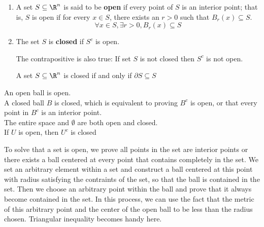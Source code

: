 \documentclass[11pt]{article}
\begin{document}
\begin{defn}
  \label{open and closed set}
  $ $ \\
  \begin{enumerate}
    \item A set $S\subseteq \R^n$ is said to be \textbf{open} if every point of $S$ is an interior point; that is, $S$ is open if for every $x\in S$, there exists an $r > 0$ such that $B_r(x)\subseteq S$.
    \[
      \forall x\in S, \exists r>0, B_r(x)\subseteq S
    \]
    \item The set $S$ is \textbf{closed} if $S^c$ is open.

    \begin{rem}
      The contrapositive is also true: If set $S$ is not closed then $S^c$ is not open.
    \end{rem}
    \begin{proposition}
      A set $S\subseteq \R^n$ is closed if and only if $\partial S\subseteq S$
    \end{proposition}
  \end{enumerate}
  \begin{rem}
    $ $\\
    An open ball is open. \\
    A closed ball $B$ is closed, which is equivalent to proving $B^c$ is open, or that every point in $B^c$ is an interior point. \\
    The entire space and $\emptyset$ are both open and closed. \\
    If $U$ is open, then $U^c$ is closed
  \end{rem}
\end{defn}



\begin{rem}
  To solve that a set is open, we prove all points in the set are interior points or there exists a ball centered at every point that contains completely in the set. We set an arbitrary element within a set and construct a ball centered at this point with radius satisfying the contraints of the set, so that the ball is contained in the set. Then we choose an arbitrary point within the ball and prove that it always become contained in the set. In this process, we can use the fact that the metric of this arbitrary point and the center of the open ball to be less than the radius chosen. Triangular inequality becomes handy here.
\end{rem}
\end{document}
